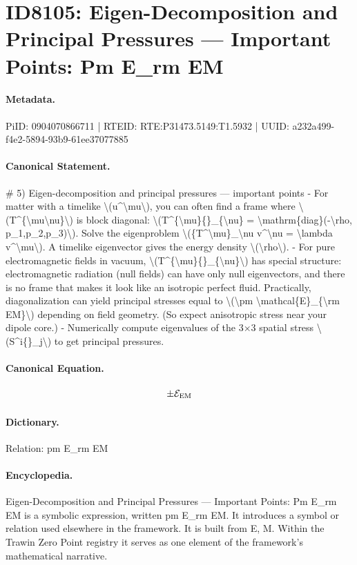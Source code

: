\section*{ID8105: Eigen-Decomposition and Principal Pressures — Important Points: Pm E\_rm EM}
\paragraph{Metadata.}
PiID: 0904070866711 | RTEID: RTE:P31473.5149:T1.5932 | UUID: a232a499-f4e2-5894-93b9-61ee37077885

\paragraph{Canonical Statement.}
\# 5) Eigen-decomposition and principal pressures — important points - For matter with a timelike \textbackslash{}(u\textasciicircum{}\textbackslash{}mu\textbackslash{}), you can often find a frame where \textbackslash{}(T\textasciicircum{}\{\textbackslash{}mu\textbackslash{}nu\}\textbackslash{}) is block diagonal: \textbackslash{}(T\textasciicircum{}\{\textbackslash{}mu\}\{\}\_\{\textbackslash{}nu\} = \textbackslash{}mathrm\{diag\}(-\textbackslash{}rho, p\_1,p\_2,p\_3)\textbackslash{}). Solve the eigenproblem \textbackslash{}(\{T\textasciicircum{}\textbackslash{}mu\}\_\textbackslash{}nu v\textasciicircum{}\textbackslash{}nu = \textbackslash{}lambda v\textasciicircum{}\textbackslash{}mu\textbackslash{}). A timelike eigenvector gives the energy density \textbackslash{}(\textbackslash{}rho\textbackslash{}). - For pure electromagnetic fields in vacuum, \textbackslash{}(T\textasciicircum{}\{\textbackslash{}mu\}\{\}\_\{\textbackslash{}nu\}\textbackslash{}) has special structure: electromagnetic radiation (null fields) can have only null eigenvectors, and there is no frame that makes it look like an isotropic perfect fluid. Practically, diagonalization can yield principal stresses equal to \textbackslash{}(\textbackslash{}pm \textbackslash{}mathcal\{E\}\_\{\textbackslash{}rm EM\}\textbackslash{}) depending on field geometry. (So expect anisotropic stress near your dipole core.) - Numerically compute eigenvalues of the 3×3 spatial stress \textbackslash{}(S\textasciicircum{}i\{\}\_j\textbackslash{}) to get principal pressures.

\paragraph{Canonical Equation.}
\[
\pm \mathcal{E}_{\rm EM}
\]

\paragraph{Dictionary.}
Relation: pm E\_rm EM

\paragraph{Encyclopedia.}
Eigen-Decomposition and Principal Pressures — Important Points: Pm E\_rm EM is a symbolic expression, written pm E\_rm EM. It introduces a symbol or relation used elsewhere in the framework. It is built from E, M. Within the Trawin Zero Point registry it serves as one element of the framework's mathematical narrative.
